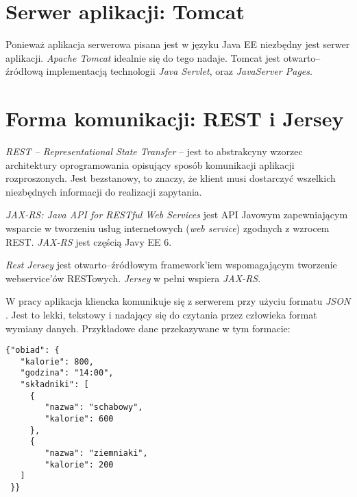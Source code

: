 \section{Serwer aplikacji: Tomcat}
\label{sec:serwer aplikacji}

Ponieważ aplikacja serwerowa pisana jest w języku Java EE niezbędny jest serwer aplikacji. {\it Apache Tomcat} \cite{Tomcat} idealnie się do tego nadaje. Tomcat jest otwarto--źródłową implementacją technologii {\it Java Servlet}, oraz {\it JavaServer Pages}. 

\section{Forma komunikacji: REST i Jersey}
\label{sec:forma komunikacji}

{\it REST -- Representational State Transfer} \cite{Rest} -- jest to abstrakcyny wzorzec architektury oprogramowania opisujący sposób komunikacji aplikacji rozproszonych. Jest bezstanowy, to znaczy, że klient musi dostarczyć wszelkich niezbędnych informacji do realizacji zapytania.

{\it JAX-RS: Java API for RESTful Web Services} jest API Javowym zapewniającym wsparcie w tworzeniu usług internetowych ({\it web service}) zgodnych z wzrocem REST. {\it JAX-RS} jest częścią Javy EE 6.

{\it Rest Jersey} \cite{Jersey} jest otwarto--źródłowym framework'iem wspomagającym tworzenie webservice'ów RESTowych. {\it Jersey} w pełni wspiera {\it JAX-RS}. 

W pracy aplikacja kliencka komunikuje się z serwerem przy użyciu formatu {\it JSON} \cite{Json}. Jest to lekki, tekstowy i nadający się do czytania przez człowieka format wymiany danych. Przykładowe dane przekazywane w tym formacie: 

\begin{lstlisting}
{"obiad": {
   "kalorie": 800,
   "godzina": "14:00",
   "składniki": [
     {
		"nazwa": "schabowy",
		"kalorie": 600
	 },
	 {
		"nazwa": "ziemniaki",
		"kalorie": 200
   ]
 }}
\end{lstlisting}
